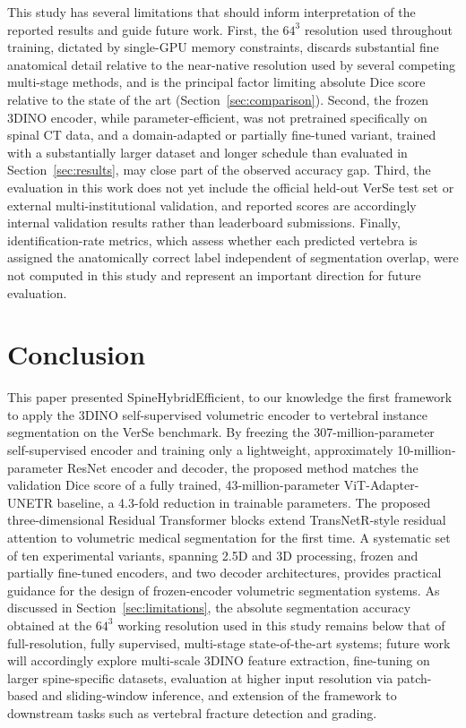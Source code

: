 \documentclass[preprint,12pt,3p]{elsarticle}
\begin{document}
This study has several limitations that should inform interpretation of the reported results and guide future work. First, the $64^3$ resolution used throughout training, dictated by single-GPU memory constraints, discards substantial fine anatomical detail relative to the near-native resolution used by several competing multi-stage methods, and is the principal factor limiting absolute Dice score relative to the state of the art (Section~\ref{sec:comparison}). Second, the frozen 3DINO encoder, while parameter-efficient, was not pretrained specifically on spinal CT data, and a domain-adapted or partially fine-tuned variant, trained with a substantially larger dataset and longer schedule than evaluated in Section~\ref{sec:results}, may close part of the observed accuracy gap. Third, the evaluation in this work does not yet include the official held-out VerSe test set or external multi-institutional validation, and reported scores are accordingly internal validation results rather than leaderboard submissions. Finally, identification-rate metrics, which assess whether each predicted vertebra is assigned the anatomically correct label independent of segmentation overlap, were not computed in this study and represent an important direction for future evaluation.

\section{Conclusion}
\label{sec:conclusion}

This paper presented SpineHybridEfficient, to our knowledge the first framework to apply the 3DINO self-supervised volumetric encoder to vertebral instance segmentation on the VerSe benchmark. By freezing the 307-million-parameter self-supervised encoder and training only a lightweight, approximately 10-million-parameter ResNet encoder and decoder, the proposed method matches the validation Dice score of a fully trained, 43-million-parameter ViT-Adapter-UNETR baseline, a 4.3-fold reduction in trainable parameters. The proposed three-dimensional Residual Transformer blocks extend TransNetR-style residual attention to volumetric medical segmentation for the first time. A systematic set of ten experimental variants, spanning 2.5D and 3D processing, frozen and partially fine-tuned encoders, and two decoder architectures, provides practical guidance for the design of frozen-encoder volumetric segmentation systems. As discussed in Section~\ref{sec:limitations}, the absolute segmentation accuracy obtained at the $64^3$ working resolution used in this study remains below that of full-resolution, fully supervised, multi-stage state-of-the-art systems; future work will accordingly explore multi-scale 3DINO feature extraction, fine-tuning on larger spine-specific datasets, evaluation at higher input resolution via patch-based and sliding-window inference, and extension of the framework to downstream tasks such as vertebral fracture detection and grading.
\end{document}
